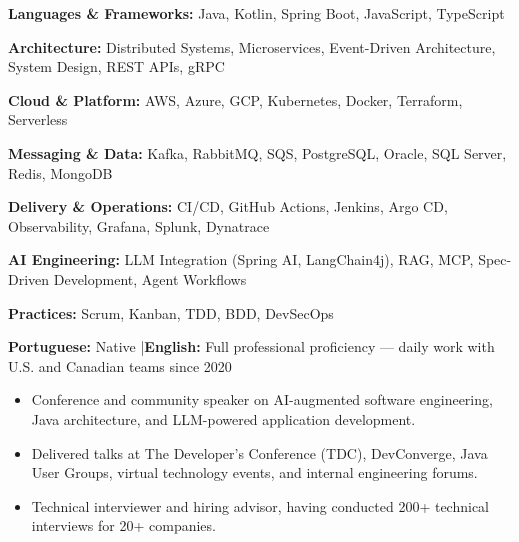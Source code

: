 \documentclass[10pt,a4paper,normalphoto]{altacv}
\newcommand{\sectionguard}{\Needspace{5\baselineskip}}
\begin{document}
\nocite{*}

\bigskip

\sectionguard
{}


\bigskip

\sectionguard
{}

\textbf{Languages \& Frameworks:} Java, Kotlin, Spring Boot, JavaScript, TypeScript

\medskip
\textbf{Architecture:} Distributed Systems, Microservices, Event-Driven Architecture, System Design, REST APIs, gRPC

\medskip
\textbf{Cloud \& Platform:} AWS, Azure, GCP, Kubernetes, Docker, Terraform, Serverless

\medskip
\textbf{Messaging \& Data:} Kafka, RabbitMQ, SQS, PostgreSQL, Oracle, SQL Server, Redis, MongoDB

\medskip
\textbf{Delivery \& Operations:} CI/CD, GitHub Actions, Jenkins, Argo CD, Observability, Grafana, Splunk, Dynatrace

\medskip
\textbf{AI Engineering:} LLM Integration (Spring AI, LangChain4j), RAG, MCP, Spec-Driven Development, Agent Workflows

\medskip
\textbf{Practices:} Scrum, Kanban, TDD, BDD, DevSecOps

\bigskip

\sectionguard
{}

\textbf{Portuguese:} Native \quad|\quad \textbf{English:} Full professional proficiency --- daily work with U.S. and Canadian teams since 2020

\bigskip

\nopagebreak

\begin{itemize}
    \item Conference and community speaker on AI-augmented software engineering, Java architecture, and LLM-powered application development.

    \item Delivered talks at The Developer's Conference (TDC), DevConverge, Java User Groups, virtual technology events, and internal engineering forums.

    \item Technical interviewer and hiring advisor, having conducted 200+ technical interviews for 20+ companies.
\end{itemize}
\end{document}
